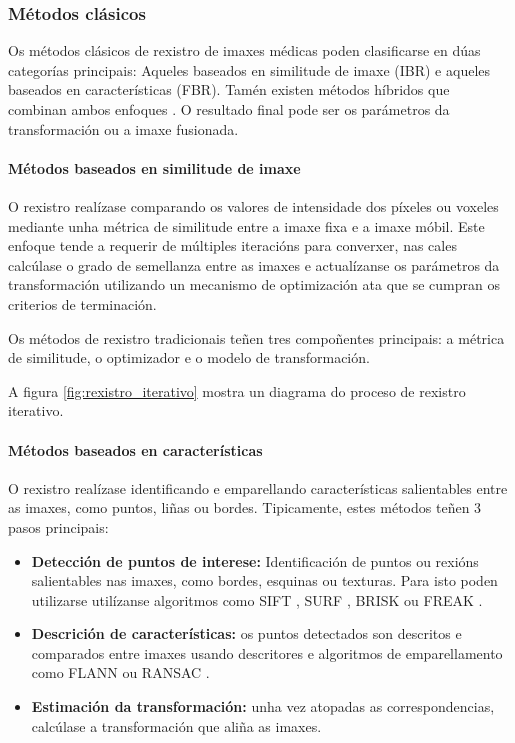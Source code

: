 \subsubsection{Métodos clásicos}
\label{subsubsec:Métodos clásicos}

Os métodos clásicos de rexistro de imaxes médicas poden clasificarse en dúas categorías principais:
Aqueles baseados en similitude de imaxe (\gls{IBR}) e aqueles baseados en características (\gls{FBR}).
Tamén existen métodos híbridos que combinan ambos enfoques \cite{integrateintfeat}.
O resultado final pode ser os parámetros da transformación ou a imaxe fusionada.

\paragraph{Métodos baseados en similitude de imaxe}
\label{par:Métodos baseados en similitude de imaxe}

O rexistro realízase comparando os valores de intensidade dos píxeles ou voxeles mediante unha métrica de similitude entre a imaxe fixa e a imaxe móbil.
Este enfoque tende a requerir de múltiples iteracións para converxer, nas cales calcúlase o grado de semellanza entre as imaxes e
actualízanse os parámetros da transformación utilizando un mecanismo de optimización ata que se cumpran os criterios de terminación.

Os métodos de rexistro tradicionais teñen tres compoñentes principais: a métrica de similitude, o optimizador e o modelo de transformación. 

A figura \ref{fig:rexistro_iterativo} mostra un diagrama do proceso de rexistro iterativo.


\paragraph{Métodos baseados en características}
\label{par:Métodos baseados en características}

O rexistro realízase identificando e emparellando características salientables entre as imaxes, como puntos, liñas ou bordes.
Tipicamente, estes métodos teñen 3 pasos principais:

\begin{itemize}
\item \textbf{Detección de puntos de interese:} Identificación de puntos ou rexións salientables nas imaxes, como bordes, esquinas ou texturas. Para isto poden utilizarse utilízanse algoritmos como SIFT \cite{sift}, SURF \cite{surf}, BRISK \cite{brisk} ou FREAK \cite{freakkeypoint}.
\item \textbf{Descrición de características:}  os puntos detectados son descritos e comparados entre imaxes usando descritores e algoritmos de emparellamento como FLANN \cite{flann} ou RANSAC \cite{ransac}.
\item \textbf{Estimación da transformación:} unha vez atopadas as correspondencias, calcúlase a transformación que aliña as imaxes.
\end{itemize}

